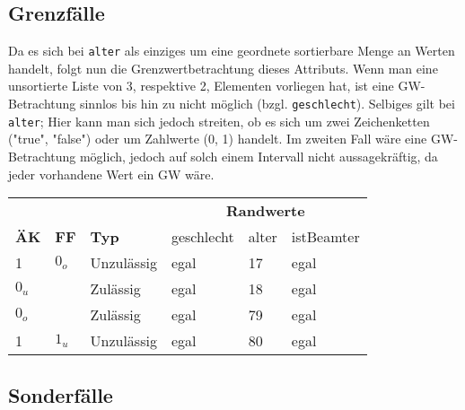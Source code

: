 \documentclass{article}
\begin{document}
\begin{enumerate}[label=\alph*.]
            \newpage

            \subsection*{Grenzfälle}

            Da es sich bei \texttt{alter} als einziges um eine geordnete sortierbare Menge an Werten handelt, folgt nun die Grenzwertbetrachtung dieses Attributs.
            Wenn man eine unsortierte Liste von 3, respektive 2, Elementen vorliegen hat, ist eine GW-Betrachtung sinnlos bis hin zu nicht möglich (bzgl. \texttt{geschlecht}).
            Selbiges gilt bei \texttt{alter}; Hier kann man sich jedoch streiten, ob es sich um zwei Zeichenketten ("true", "false") oder um Zahlwerte (0, 1) handelt.
            Im zweiten Fall wäre eine GW-Betrachtung möglich, jedoch auf solch einem Intervall nicht aussagekräftig, da jeder vorhandene Wert ein GW wäre.\\

            \begin{tabularx}{\textwidth}{|p{3em}|p{3em}|X|p{5em}|p{7em}|p{5em}|}
                \hline
                \cellcolor[gray]{0.75} & \cellcolor[gray]{0.75} & \cellcolor[gray]{0.75} & \multicolumn{3}{c|}{\cellcolor[gray]{0.75} \textbf{Randwerte}}\\
                \multirow{-2}{*}{\cellcolor[gray]{0.75} \textbf{ÄK}} & \multirow{-2}{*}{\cellcolor[gray]{0.75} \textbf{FF}} & \multirow{-2}{*}{\cellcolor[gray]{0.75} \textbf{Typ}} & \cellcolor[gray]{0.75} geschlecht & \cellcolor[gray]{0.75} alter & \cellcolor[gray]{0.75} istBeamter\\\hline  
                1 & $0_o$ & Unzulässig & egal & 17 & egal\\\hline
                $0_u$ & & Zulässig & egal & 18 & egal\\\hline
                $0_o$ & & Zulässig & egal & 79 & egal\\\hline
                1 & $1_u$ & Unzulässig & egal & 80 & egal\\\hline
            \end{tabularx}

            \subsection*{Sonderfälle}


\end{enumerate}
\end{document}
